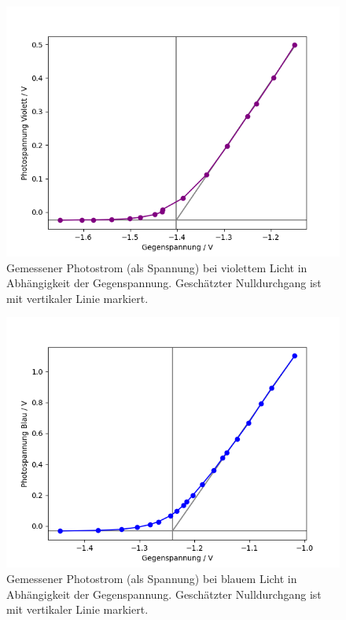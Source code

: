 \documentclass{article}
\begin{document}
\newpage
\begin{figure}[H]
\includegraphics[scale=0.6]{purple.png}
\caption{Gemessener Photostrom (als Spannung) bei violettem Licht in Abhängigkeit der Gegenspannung. Geschätzter Nulldurchgang ist mit vertikaler Linie markiert.}
\label{fig:daten_purple}
\end{figure}
\begin{figure}[H]
\includegraphics[scale=0.6]{blue.png}
\caption{Gemessener Photostrom (als Spannung) bei blauem Licht in Abhängigkeit der Gegenspannung. Geschätzter Nulldurchgang ist mit vertikaler Linie markiert.}
\label{fig:daten_blue}
\end{figure}
\end{document}
